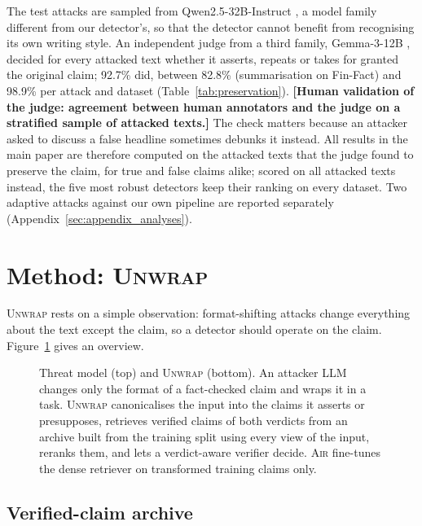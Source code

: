 \documentclass[11pt]{article}
\newcommand{\tbd}[1]{\textbf{[#1]}}
\newcommand{\method}{\textsc{Unwrap}}
\newcommand{\air}{\textsc{Air}}
\begin{document}
The test attacks are sampled from Qwen2.5-32B-Instruct \citep{qwen2024qwen25}, a model family different from our detector's, so that the detector cannot benefit from recognising its own writing style. An independent judge from a third family, Gemma-3-12B \citep{gemma2025gemma3}, decided for every attacked text whether it asserts, repeats or takes for granted the original claim; 92.7\% did, between 82.8\% (summarisation on Fin-Fact) and 98.9\% per attack and dataset (Table~\ref{tab:preservation}). \tbd{Human validation of the judge: agreement between human annotators and the judge on a stratified sample of attacked texts.} The check matters because an attacker asked to discuss a false headline sometimes debunks it instead. All results in the main paper are therefore computed on the attacked texts that the judge found to preserve the claim, for true and false claims alike; scored on all attacked texts instead, the five most robust detectors keep their ranking on every dataset. Two adaptive attacks against our own pipeline are reported separately (Appendix~\ref{sec:appendix_analyses}).

\section{Method: \method{}}
\label{sec:method}

\method{} rests on a simple observation: format-shifting attacks change everything about the text except the claim, so a detector should operate on the claim. Figure~\ref{fig:system} gives an overview.

\begin{figure}[t]
\centering
{\color{black}\resizebox{\textwidth}{!}{}}
\color{newtext}
\caption{Threat model (top) and \method{} (bottom). An attacker LLM changes only the format of a fact-checked claim and wraps it in a task. \method{} canonicalises the input into the claims it asserts or presupposes, retrieves verified claims of both verdicts from an archive built from the training split using every view of the input, reranks them, and lets a verdict-aware verifier decide. \air{} fine-tunes the dense retriever on transformed training claims only.}
\label{fig:system}
\end{figure}

\subsection{Verified-claim archive}
\end{document}
